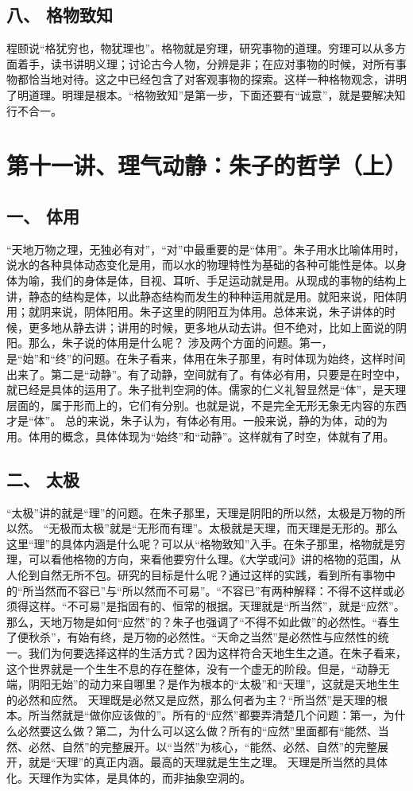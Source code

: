 \documentclass{article}
\begin{document}
\subsection{八、	格物致知}
程颐说“格犹穷也，物犹理也”。格物就是穷理，研究事物的道理。穷理可以从多方面着手，读书讲明义理；讨论古今人物，分辨是非；在应对事物的时候，对所有事物都恰当地对待。这之中已经包含了对客观事物的探索。这样一种格物观念，讲明了明道理。明理是根本。“格物致知”是第一步，下面还要有“诚意”，就是要解决知行不合一。

\section{第十一讲、理气动静：朱子的哲学（上）}
\subsection{一、	体用}
“天地万物之理，无独必有对”，“对”中最重要的是“体用”。朱子用水比喻体用时，说水的各种具体动态变化是用，而以水的物理特性为基础的各种可能性是体。以身体为喻，我们的身体是体，目视、耳听、手足运动就是用。从现成的事物的结构上讲，静态的结构是体，以此静态结构而发生的种种运用就是用。就阳来说，阳体阴用；就阴来说，阴体阳用。朱子这里的阴阳互为体用。总体来说，朱子讲体的时候，更多地从静去讲；讲用的时候，更多地从动去讲。但不绝对，比如上面说的阴阳。那么，朱子说的体用是什么呢？
涉及两个方面的问题。第一，是“始”和“终”的问题。在朱子看来，体用在朱子那里，有时体现为始终，这样时间出来了。第二是“动静”。有了动静，空间就有了。有体必有用，只要是在时空中，就已经是具体的运用了。朱子批判空洞的体。儒家的仁义礼智显然是“体”，是天理层面的，属于形而上的，它们有分别。也就是说，不是完全无形无象无内容的东西才是“体”。
总的来说，朱子认为，有体必有用。一般来说，静的为体，动的为用。体用的概念，具体体现为“始终”和“动静”。这样就有了时空，体就有了用。
\subsection{二、	太极}
“太极”讲的就是“理”的问题。在朱子那里，天理是阴阳的所以然，太极是万物的所以然。
“无极而太极”就是“无形而有理”。太极就是天理，而天理是无形的。那么这里“理”的具体内涵是什么呢？可以从“格物致知”入手。在朱子那里，格物就是穷理，可以看他格物的方向，来看他要穷什么理。《大学或问》讲的格物的范围，从人伦到自然无所不包。研究的目标是什么呢？通过这样的实践，看到所有事物中的“所当然而不容已”与“所以然而不可易”。“不容已”有两种解释：不得不这样或必须得这样。“不可易”是指固有的、恒常的根据。天理就是“所当然”，就是“应然”。
那么，天地万物是如何“应然”的？朱子也强调了“不得不如此做”的必然性。“春生了便秋杀”，有始有终，是万物的必然性。“天命之当然”是必然性与应然性的统一。我们为何要选择这样的生活方式？因为这样符合天地生生之道。在朱子看来，这个世界就是一个生生不息的存在整体，没有一个虚无的阶段。但是，“动静无端，阴阳无始”的动力来自哪里？是作为根本的“太极”和“天理”，这就是天地生生的必然和应然。
天理既是必然又是应然，那么何者为主？“所当然”是天理的根本。所当然就是“做你应该做的”。所有的“应然”都要弄清楚几个问题：第一，为什么必然要这么做？第二，为什么可以这么做？所有的“应然”里面都有“能然、当然、必然、自然”的完整展开。以“当然”为核心，“能然、必然、自然”的完整展开，就是“天理”的真正内涵。最高的天理就是生生之理。
天理是所当然的具体化。天理作为实体，是具体的，而非抽象空洞的。
\end{document}
